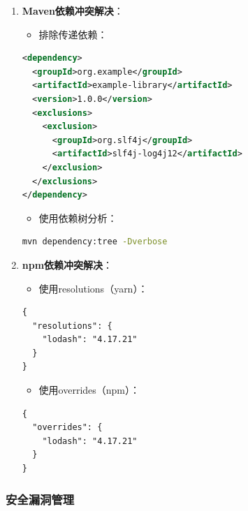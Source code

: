 \begin{enumerate}
\def\labelenumi{\arabic{enumi}.}
\tightlist
\item
  \textbf{Maven依赖冲突解决}：

  \begin{itemize}
  \tightlist
  \item
    排除传递依赖：
  \end{itemize}

\begin{lstlisting}[language=XML]
<dependency>
  <groupId>org.example</groupId>
  <artifactId>example-library</artifactId>
  <version>1.0.0</version>
  <exclusions>
    <exclusion>
      <groupId>org.slf4j</groupId>
      <artifactId>slf4j-log4j12</artifactId>
    </exclusion>
  </exclusions>
</dependency>
\end{lstlisting}

  \begin{itemize}
  \tightlist
  \item
    使用依赖树分析：
  \end{itemize}

\begin{lstlisting}[language=bash]
mvn dependency:tree -Dverbose
\end{lstlisting}
\item
  \textbf{npm依赖冲突解决}：

  \begin{itemize}
  \tightlist
  \item
    使用resolutions（yarn）：
  \end{itemize}

\begin{lstlisting}
{
  "resolutions": {
    "lodash": "4.17.21"
  }
}
\end{lstlisting}

  \begin{itemize}
  \tightlist
  \item
    使用overrides（npm）：
  \end{itemize}

\begin{lstlisting}
{
  "overrides": {
    "lodash": "4.17.21"
  }
}
\end{lstlisting}
\end{enumerate}

\subsubsection{安全漏洞管理}\label{ux5b89ux5168ux6f0fux6d1eux7ba1ux7406}

